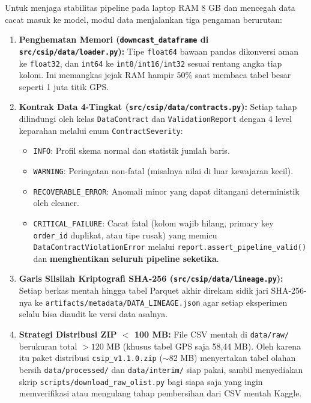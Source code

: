 \documentclass[11pt,a4paper,oneside]{book}
\newcommand{\code}[1]{{\small\nolinkurl{#1}}}
\begin{document}
Untuk menjaga stabilitas pipeline pada laptop RAM 8 GB dan mencegah data cacat masuk ke model, modul data menjalankan tiga pengaman berurutan:
\begin{enumerate}
  \item \textbf{Penghematan Memori (\code{downcast_dataframe} di \code{src/csip/data/loader.py}):} Tipe \code{float64} bawaan pandas dikonversi aman ke \code{float32}, dan \code{int64} ke \code{int8}/\code{int16}/\code{int32} sesuai rentang angka tiap kolom. Ini memangkas jejak RAM hampir 50\% saat membaca tabel besar seperti 1 juta titik GPS.
  \item \textbf{Kontrak Data 4-Tingkat (\code{src/csip/data/contracts.py}):} Setiap tahap dilindungi oleh kelas \code{DataContract} dan \code{ValidationReport} dengan 4 level keparahan melalui enum \code{ContractSeverity}:
    \begin{itemize}
      \item \code{INFO}: Profil skema normal dan statistik jumlah baris.
      \item \code{WARNING}: Peringatan non-fatal (misalnya nilai di luar kewajaran kecil).
      \item \code{RECOVERABLE_ERROR}: Anomali minor yang dapat ditangani deterministik oleh cleaner.
      \item \code{CRITICAL_FAILURE}: Cacat fatal (kolom wajib hilang, primary key \code{order_id} duplikat, atau tipe rusak) yang memicu \code{DataContractViolationError} melalui \code{report.assert_pipeline_valid()} dan \textbf{menghentikan seluruh pipeline seketika}.
    \end{itemize}
  \item \textbf{Garis Silsilah Kriptografi SHA-256 (\code{src/csip/data/lineage.py}):} Setiap berkas mentah hingga tabel Parquet akhir direkam sidik jari SHA-256-nya ke \code{artifacts/metadata/DATA_LINEAGE.json} agar setiap eksperimen selalu bisa diaudit ke versi data asalnya.
  \item \textbf{Strategi Distribusi ZIP $<$ 100 MB:} File CSV mentah di \code{data/raw/} berukuran total $>120$ MB (khusus tabel GPS saja 58,44 MB). Oleh karena itu paket distribusi \code{csip_v1.1.0.zip} ($\sim$82 MB) menyertakan tabel olahan bersih \code{data/processed/} dan \code{data/interim/} siap pakai, sambil menyediakan skrip \code{scripts/download_raw_olist.py} bagi siapa saja yang ingin memverifikasi atau mengulang tahap pembersihan dari CSV mentah Kaggle.
\end{enumerate}

\end{document}
